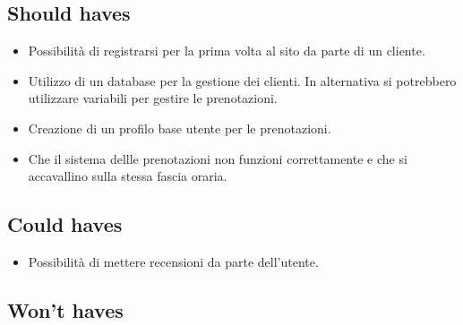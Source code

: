 \documentclass{article}
\begin{document}
\subsection{Should haves}
\begin{itemize}
    \item Possibilità di registrarsi per la prima volta al sito da parte di un cliente.
    \item Utilizzo di un database per la gestione dei clienti. In alternativa si potrebbero utilizzare 
    variabili per gestire le prenotazioni.
    \item Creazione di un profilo base utente per le prenotazioni.
    \item Che il sistema dellle prenotazioni non funzioni correttamente 
    e che si accavallino sulla stessa fascia oraria.
\end{itemize}

\subsection{Could haves}
\begin{itemize}
    \item Possibilità di mettere recensioni da parte dell'utente.
\end{itemize}

\subsection{Won't haves}
\end{document}
